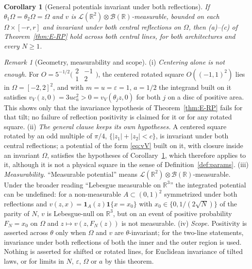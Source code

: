\documentclass[11pt]{article}
\theoremstyle{plain}
\newtheorem{corollary}[theorem]{Corollary}
\theoremstyle{definition}
\theoremstyle{remark}
\newtheorem{remark}[theorem]{Remark}
\newcommand{\R}{\mathbb{R}}
\newcommand{\cB}{\mathcal{B}}
\newcommand{\cL}{\mathcal{L}}
\newcommand{\ind}{\mathbf{1}}
\begin{document}
\begin{corollary}[General potentials invariant under both reflections]\label{cor:E-general}
If $\theta_1\Omega=\theta_2\Omega=\Omega$ and $v$ is $\cL(\R^{2})\otimes\cB(\R)$-measurable,
bounded on each $\Omega\times[-r,r]$ and invariant under both central reflections on
$\Omega$, then (a)--(c) of Theorem~\ref{thm:E-RP} hold across both central lines,
for both architectures and every $N\ge1$.
\end{corollary}

\begin{remark}[Geometry, measurability and scope]\label{rem:rotated}
(i) \emph{Centering alone is not enough.} For
$O=5^{-1/2}\bigl(\begin{smallmatrix}2&-1\\1&2\end{smallmatrix}\bigr)$, the centered
rotated square $O((-1,1)^{2})$ lies in $\Omega=[-2,2]^{2}$, and with $m=u=\varepsilon=1$,
$a=1/2$ the integrand built on it satisfies $v_V(z,0)=3uc_a^{2}>0=v_V(\theta_jz,0)$ for
both $j$ on a disc of positive area. This shows only that the invariance
hypothesis of Theorem~\ref{thm:E-RP} fails for that tilt; no failure of reflection
positivity is claimed for it or for any rotated square.
(ii) \emph{The general clause keeps its own hypotheses.} A centered square rotated
by an odd multiple of $\pi/4$, $\{|z_1|+|z_2|<c\}$, is invariant under both
central reflections; a potential of the form \eqref{eq:vV} built on it, with
closure inside an invariant $\Omega$, satisfies the hypotheses of
Corollary~\ref{cor:E-general}, which therefore applies to it, although it is not
a physical square in the sense of Definition~\ref{def:params}.
(iii) \emph{Measurability.} ``Measurable potential'' means
$\cL(\R^{2})\otimes\cB(\R)$-measurable. Under the broader reading ``Lebesgue
measurable on $\R^{3}$'' the integrated potential can be undefined: for a
non-measurable $A\subset(0,1)^{2}$ symmetrized under both reflections and
$v(z,x)=\ind_{A}(z)\ind\{x=x_0\}$ with $x_0\in\{0,1/(2\sqrt N)\}$ of the parity of
$N$, $v$ is Lebesgue-null on $\R^{3}$, but on an event of positive probability
$F_N=x_0$ on $\Omega$ and $z\mapsto v(z,F_N(z))$ is not measurable.
(iv) \emph{Scope.} Positivity is asserted across $\theta$ only when $\Omega$ and $v$ are
$\theta$-invariant; for the two-line statements, invariance under both reflections
of both the inner and the outer region is used. Nothing is asserted for
shifted or rotated lines, for Euclidean invariance of tilted laws, or for
limits in $N$, $\varepsilon$, $\Omega$ or $a$ by this theorem.
\end{remark}
\end{document}
